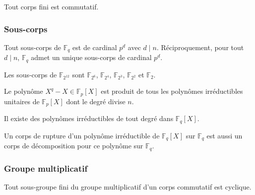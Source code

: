 

  \begin{theorem}
    Tout corps fini est commutatif.
  \end{theorem}

  \subsubsection{Sous-corps}


  \begin{theorem}
    Tout sous-corps de $\mathbb{F}_q$ est de cardinal $p^d$ avec $d \mid n$. Réciproquement, pour tout $d \mid n$, $\mathbb{F}_q$ admet un unique sous-corps de cardinal $p^d$.
  \end{theorem}

  \begin{example}
    Les sous-corps de $\mathbb{F}_{2^{12}}$ sont $\mathbb{F}_{2^6}$, $\mathbb{F}_{2^4}$, $\mathbb{F}_{2^3}$, $\mathbb{F}_{2^2}$ et $\mathbb{F}_{2}$.
  \end{example}

  \begin{corollary}
    Le polynôme $X^q - X \in \mathbb{F}_p[X]$ est produit de tous les polynômes irréductibles unitaires de $\mathbb{F}_p[X]$ dont le degré divise $n$.
  \end{corollary}

  \begin{corollary}
    Il existe des polynômes irréductibles de tout degré dans $\mathbb{F}_q[X]$.
  \end{corollary}

  \begin{corollary}
    Un corps de rupture d'un polynôme irréductible de $\mathbb{F}_q[X]$ sur $\mathbb{F}_q$ est aussi un corps de décomposition pour ce polynôme sur $\mathbb{F}_q$.
  \end{corollary}

  \subsubsection{Groupe multiplicatif}


  \begin{theorem}
    Tout sous-groupe fini du groupe multiplicatif d'un corps commutatif est cyclique.
  \end{theorem}


